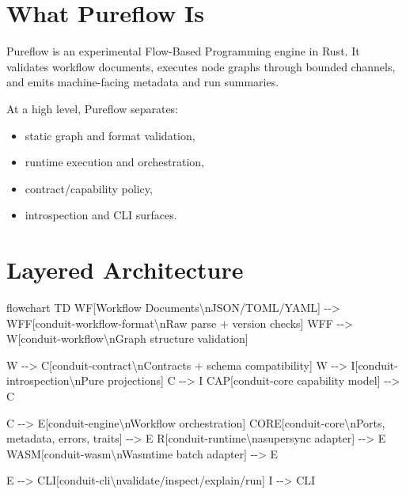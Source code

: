 \documentclass[
  letterpaper,
]{report}
\newenvironment{Shaded}{\begin{snugshade}}{\end{snugshade}}
\newcommand{\NormalTok}[1]{\textcolor[rgb]{0.00,0.23,0.31}{#1}}
\providecommand{\tightlist}{%
  \setlength{\itemsep}{0pt}\setlength{\parskip}{0pt}}
\begin{document}
\section{What Pureflow Is}\label{what-pureflow-is}

Pureflow is an experimental Flow-Based Programming engine in Rust. It
validates workflow documents, executes node graphs through bounded
channels, and emits machine-facing metadata and run summaries.

At a high level, Pureflow separates:

\begin{itemize}
\tightlist
\item
  static graph and format validation,
\item
  runtime execution and orchestration,
\item
  contract/capability policy,
\item
  introspection and CLI surfaces.
\end{itemize}

\section{Layered Architecture}\label{layered-architecture}

\begin{Shaded}
\begin{Highlighting}[]
\NormalTok{flowchart TD}
\NormalTok{    WF[Workflow Documents\textbackslash{}nJSON/TOML/YAML] {-}{-}\textgreater{} WFF[conduit{-}workflow{-}format\textbackslash{}nRaw parse + version checks]}
\NormalTok{    WFF {-}{-}\textgreater{} W[conduit{-}workflow\textbackslash{}nGraph structure validation]}

\NormalTok{    W {-}{-}\textgreater{} C[conduit{-}contract\textbackslash{}nContracts + schema compatibility]}
\NormalTok{    W {-}{-}\textgreater{} I[conduit{-}introspection\textbackslash{}nPure projections]}
\NormalTok{    C {-}{-}\textgreater{} I}
\NormalTok{    CAP[conduit{-}core capability model] {-}{-}\textgreater{} C}

\NormalTok{    C {-}{-}\textgreater{} E[conduit{-}engine\textbackslash{}nWorkflow orchestration]}
\NormalTok{    CORE[conduit{-}core\textbackslash{}nPorts, metadata, errors, traits] {-}{-}\textgreater{} E}
\NormalTok{    R[conduit{-}runtime\textbackslash{}nasupersync adapter] {-}{-}\textgreater{} E}
\NormalTok{    WASM[conduit{-}wasm\textbackslash{}nWasmtime batch adapter] {-}{-}\textgreater{} E}

\NormalTok{    E {-}{-}\textgreater{} CLI[conduit{-}cli\textbackslash{}nvalidate/inspect/explain/run]}
\NormalTok{    I {-}{-}\textgreater{} CLI}
\end{Highlighting}
\end{Shaded}
\end{document}
